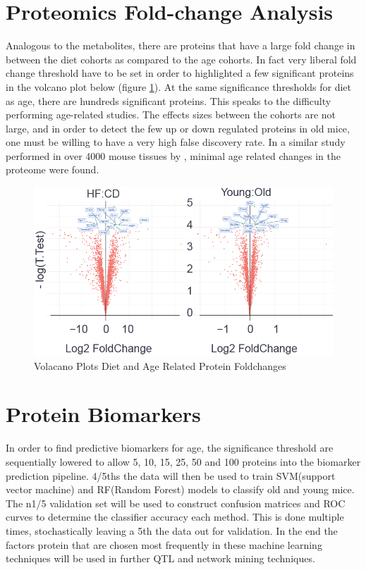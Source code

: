 \documentclass[a4paper]{book}
\begin{document}
	\section{Proteomics Fold-change Analysis}
	
	Analogous to the metabolites, there are proteins that have a large fold change in between the diet cohorts as compared to the age cohorts. In fact very liberal fold change threshold have to be set in order to highlighted a few significant proteins in the volcano plot below (figure \ref{volcano plot: Protein Diet and Age Foldchanges}). At the same significance thresholds for diet as age, there are hundreds significant proteins. This speaks to the difficulty performing age-related studies. The effects sizes between the cohorts are not large, and in order to detect the few up or down regulated proteins in old mice, one must be willing to have a very high false discovery rate. In a similar study performed in over 4000 mouse tissues by \citeauthor{Walther2011AccurateQuantification}, minimal age related changes in the proteome were found. 
	
	\begin{figure}
		\centering
		\includegraphics[width=\linewidth]{3.Proteomics/Protein_foldchanges}
		\caption{Volacano Plots Diet and Age Related Protein Foldchanges}
		\label{volcano plot: Protein Diet and Age Foldchanges}
	\end{figure}
	
	\section{Protein Biomarkers}
	
	In order to find predictive biomarkers for age, the significance threshold are sequentially lowered to allow 5, 10, 15, 25, 50 and 100 proteins into the biomarker prediction pipeline. 4/5ths the data will then be used to train SVM(support vector machine) and RF(Random Forest) models to classify old and young mice. The n1/5 validation set will be used to construct confusion matrices and ROC curves to determine the classifier accuracy each method. This is done multiple times, stochastically leaving a 5th the data out for validation. In the end the factors protein that are chosen most frequently in these machine learning techniques will be used in further QTL and network mining techniques.
	
\end{document}
